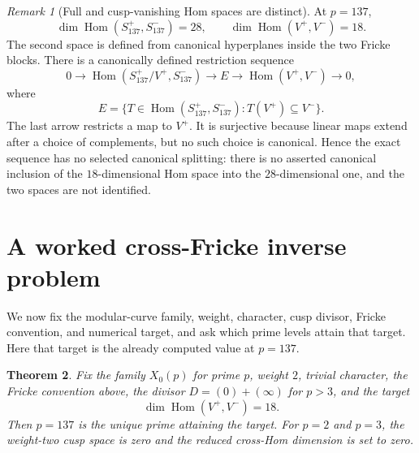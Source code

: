 \documentclass[11pt]{article}
\newtheorem{theorem}{Theorem}[section]
\theoremstyle{definition}
\theoremstyle{remark}
\newtheorem{remark}[theorem]{Remark}
\DeclareMathOperator{\Hom}{Hom}
\begin{document}
\begin{remark}[Full and cusp-vanishing Hom spaces are distinct]\label{rem:distinct-hom}
At $p=137$,
\[
  \dim\Hom(S_{137}^+,S_{137}^-)=28,
  \qquad
  \dim\Hom(V^+,V^-)=18.
\]
The second space is defined from canonical hyperplanes inside the two Fricke
blocks.  There is a canonically defined restriction sequence
\[
  0\longrightarrow
  \Hom(S_{137}^+/V^+,S_{137}^-)
  \longrightarrow E
  \longrightarrow \Hom(V^+,V^-)
  \longrightarrow0,
\]
where
\[
  E=\{T\in\Hom(S_{137}^+,S_{137}^-):T(V^+)\subseteq V^-\}.
\]
The last arrow restricts a map to $V^+$.  It is surjective because linear maps
extend after a choice of complements, but no such choice is canonical.  Hence
the exact sequence has no selected canonical splitting: there is no asserted
canonical inclusion of the $18$-dimensional Hom space into the
$28$-dimensional one, and the two spaces are not identified.
\end{remark}

\section{A worked cross-Fricke inverse problem}

We now fix the modular-curve family, weight, character, cusp divisor, Fricke
convention, and numerical target, and ask which prime levels attain that
target.  Here that target is the already computed value at $p=137$.

\begin{theorem}\label{thm:target-conditioned-locus}
Fix the family $X_0(p)$ for prime $p$, weight $2$, trivial character, the
Fricke convention above, the divisor $D=(0)+(\infty)$ for $p>3$, and the
target
\[
  \dim\Hom(V^+,V^-)=18.
\]
Then $p=137$ is the unique prime attaining the target.  For $p=2$ and $p=3$,
the weight-two cusp space is zero and the reduced cross-Hom dimension is set
to zero.
\end{theorem}
\end{document}
